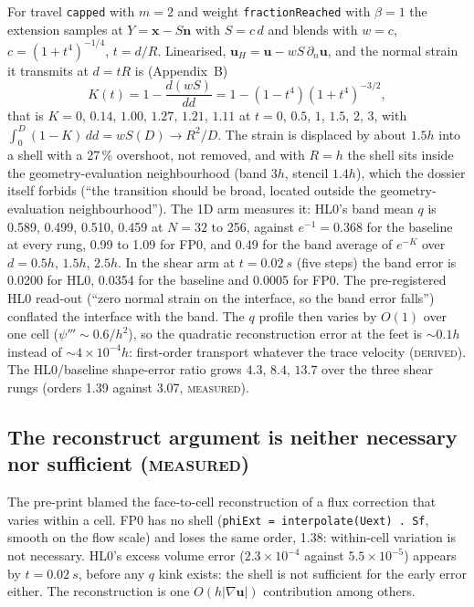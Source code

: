 \documentclass[11pt,a4paper]{article}
\newcommand{\Meas}{\textsc{measured}}
\newcommand{\Der}{\textsc{derived}}
\newcommand{\bu}{\mathbf{u}}
\newcommand{\bn}{\mathbf{n}}
\newcommand{\bx}{\mathbf{x}}
\begin{document}
For travel \texttt{capped} with $m=2$ and weight \texttt{fractionReached} with $\beta=1$ the
extension samples at $Y=\bx-S\bn$ with $S=c\,d$ and blends with $w=c$,
$c=(1+t^4)^{-1/4}$, $t=d/R$. Linearised, $\bu_H=\bu-wS\,\partial_n\bu$, and the normal strain it
transmits at $d=tR$ is (Appendix~B)
\begin{equation}
  K(t)=1-\frac{d(wS)}{dd}=1-(1-t^4)(1+t^4)^{-3/2},
\end{equation}
that is $K=0$, $0.14$, $1.00$, $1.27$, $1.21$, $1.11$ at $t=0$, $0.5$, $1$, $1.5$, $2$, $3$,
with $\int_0^D(1-K)\,dd=wS(D)\to R^2/D$. The strain is displaced by about $1.5h$ into a shell
with a 27\,\% overshoot, not removed, and with $R=h$ the shell sits inside the
geometry-evaluation neighbourhood (band $3h$, stencil $1.4h$), which the dossier itself forbids
(``the transition should be broad, located outside the geometry-evaluation neighbourhood'').
The 1D arm measures it: HL0's band mean $q$ is 0.589, 0.499, 0.510, 0.459 at $N=32$ to 256,
against $e^{-1}=0.368$ for the baseline at every rung, 0.99 to 1.09 for FP0, and 0.49 for the
band average of $e^{-K}$ over $d=0.5h$, $1.5h$, $2.5h$. In the shear arm at $t=\SI{0.02}{s}$
(five steps) the band error is 0.0200 for HL0, 0.0354 for the baseline and 0.0005 for FP0. The
pre-registered HL0 read-out (``zero normal strain on the interface, so the band error falls'')
conflated the interface with the band. The $q$ profile then varies by $O(1)$ over one cell
($\psi'''\sim0.6/h^2$), so the quadratic reconstruction error at the feet is $\sim0.1h$ instead
of $\sim4\times10^{-4}h$: first-order transport whatever the trace velocity (\Der). The
HL0/baseline shape-error ratio grows $4.3$, $8.4$, $13.7$ over the three shear rungs (orders
1.39 against 3.07, \Meas).

\subsection{The reconstruct argument is neither necessary nor sufficient (\Meas)}

The pre-print blamed the face-to-cell reconstruction of a flux correction that varies within a
cell. FP0 has no shell (\texttt{phiExt = interpolate(Uext)\,.\,Sf}, smooth on the flow scale)
and loses the same order, 1.38: within-cell variation is not necessary. HL0's excess volume
error ($2.3\times10^{-4}$ against $5.5\times10^{-5}$) appears by $t=\SI{0.02}{s}$, before any
$q$ kink exists: the shell is not sufficient for the early error either. The reconstruction is
one $O(h|\nabla\bu|)$ contribution among others.
\end{document}
